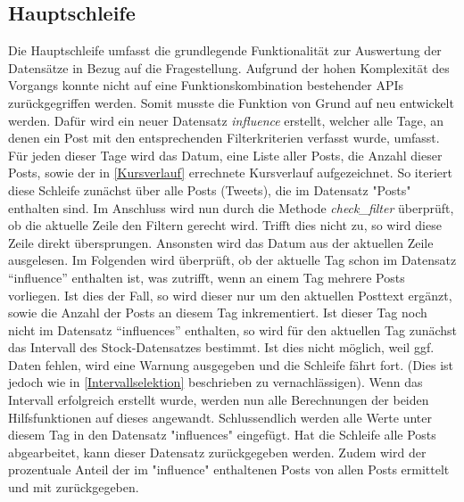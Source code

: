 \documentclass{article}
\begin{document}
\subsection{Hauptschleife}
Die Hauptschleife umfasst die grundlegende Funktionalität zur Auswertung der Datensätze in Bezug auf die Fragestellung.
Aufgrund der hohen Komplexität des Vorgangs konnte nicht auf eine Funktionskombination bestehender APIs zurückgegriffen werden.
Somit musste die Funktion von Grund auf neu entwickelt werden.
Dafür wird ein neuer Datensatz \textit{influence} erstellt, welcher alle Tage, an denen ein Post mit den entsprechenden Filterkriterien verfasst wurde, umfasst.
Für jeden dieser Tage wird das Datum, eine Liste aller Posts, die Anzahl dieser Posts, sowie der in \ref{Kursverlauf} errechnete Kursverlauf aufgezeichnet.
So iteriert diese Schleife zunächst über alle Posts (Tweets), die im Datensatz "Posts" enthalten sind.
Im Anschluss wird nun durch die Methode \textit{check_filter} überprüft, ob die aktuelle Zeile den Filtern gerecht wird.
Trifft dies nicht zu, so wird diese Zeile direkt übersprungen.
Ansonsten wird das Datum aus der aktuellen Zeile ausgelesen.
Im Folgenden wird überprüft, ob der aktuelle Tag schon im Datensatz ``influence'' enthalten ist, was zutrifft, wenn an einem Tag mehrere Posts vorliegen.
Ist dies der Fall, so wird dieser nur um den aktuellen Posttext ergänzt, sowie die Anzahl der Posts an diesem Tag inkrementiert.
Ist dieser Tag noch nicht im Datensatz ``influences'' enthalten, so wird für den aktuellen Tag zunächst das Intervall des Stock-Datensatzes bestimmt.
Ist dies nicht möglich, weil ggf. Daten fehlen, wird eine Warnung ausgegeben und die Schleife fährt fort.
(Dies ist jedoch wie in \ref{Intervallselektion} beschrieben zu vernachlässigen).
Wenn das Intervall erfolgreich erstellt wurde, werden nun alle Berechnungen der beiden Hilfsfunktionen auf dieses angewandt.
Schlussendlich werden alle Werte unter diesem Tag in den Datensatz "influences" eingefügt.
Hat die Schleife alle Posts abgearbeitet, kann dieser Datensatz zurückgegeben werden.
Zudem wird der prozentuale Anteil der im "influence" enthaltenen Posts von allen Posts ermittelt und mit zurückgegeben.
\end{document}
